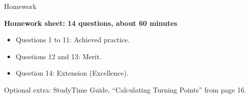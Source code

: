 \documentclass[aspectratio=169,11pt,t,xcolor=table]{beamer}
\begin{document}
\begin{frame}{Homework}\relax
{\sEmph\bfseries Homework sheet: 14 questions, about 60 minutes\par}
\vskip4mm
\begin{itemize}
\item Questions 1 to 11: Achieved practice.
\item Questions 12 and 13: Merit.
\item Question 14: Extension (Excellence).
\end{itemize}
\vskip4mm
Optional extra: StudyTime Guide, ``Calculating Turning Points'' from page 16.
\end{frame}
\end{document}

